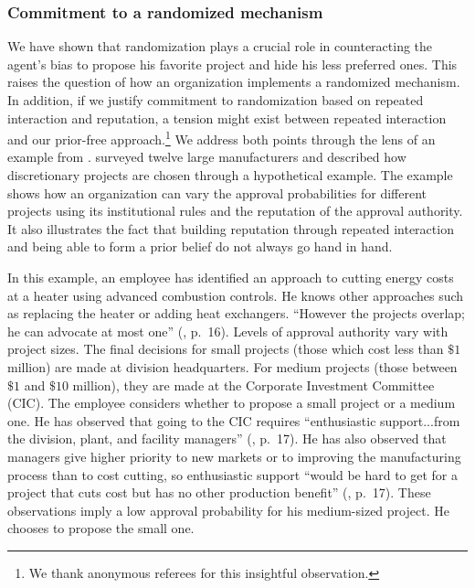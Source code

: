 \documentclass[12pt,english]{article}
\theoremstyle{remark}
\theoremstyle{plain}
\theoremstyle{definition}
\begin{document}
\subsubsection{Commitment to a randomized mechanism}
\label{se:committorandomization} %

We have shown that randomization plays a crucial role in counteracting the agent's bias to propose his favorite project and hide his less preferred ones. This raises the question of how an organization implements a randomized mechanism. In addition, if we justify commitment to randomization based on repeated interaction and reputation, a tension might exist between repeated interaction and our prior-free approach.\footnote{We thank anonymous referees for this insightful observation.} We address both points through the lens of an example from \cite{Ross1986}. \cite{Ross1986} surveyed twelve large manufacturers and described how discretionary projects are chosen through a hypothetical example. The example shows how an organization can vary the approval probabilities for different projects using its institutional rules and the reputation of the approval authority. It also illustrates the fact that building reputation through repeated interaction and being able to form a prior belief do not always go hand in hand. 

In this example, an employee has identified an approach to cutting energy costs at a heater using advanced combustion controls. He knows other approaches such as replacing the heater or adding heat exchangers. ``However the projects overlap; he can advocate at most one'' (\cite{Ross1986}, p.\ 16). Levels of approval authority vary with project sizes. The final decisions for small projects (those which cost less than $\$1$ million) are made at division headquarters. For medium projects (those between $\$1$ and $\$10$ million), they are made at the Corporate Investment Committee (CIC). The employee considers whether to propose a small project or a medium one. He has observed that going to the CIC requires ``enthusiastic support...from the division, plant, and facility managers'' (\cite{Ross1986}, p.\ 17). He has also observed that managers give higher priority to new markets or to improving the manufacturing process than to cost cutting, so enthusiastic support ``would be hard to get for a project that cuts cost but has no other production benefit'' (\cite{Ross1986}, p.\ 17). These observations imply a low approval probability for his medium-sized project. He chooses to propose the small one. 
\end{document}
